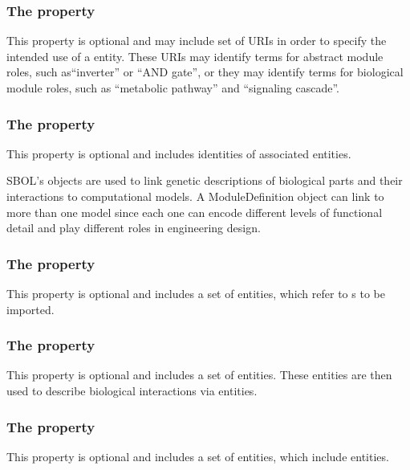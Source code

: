 \subsubsection*{The  property}
This property is optional and may include  set of URIs in order to specify the intended use of a  entity. These URIs may identify terms for abstract module roles, such as``inverter'' or ``AND gate'', or they may identify terms for biological module roles, such as ``metabolic pathway'' and ``signaling cascade''.

\subsubsection*{The  property}
This property is optional and includes identities of associated  entities.

SBOL's  objects are used to link genetic descriptions of biological parts and their interactions to computational models.
A ModuleDefinition object can link to more than one model since each one can encode different levels of functional detail and play different roles in engineering design. 


\subsubsection*{The  property}
This property is optional and includes a set of  entities, which refer to s to be imported.

\subsubsection*{The  property}
This property is optional and includes a set of  entities. These entities are then used to describe biological interactions via  entities.

\subsubsection*{The  property}
This property is optional and includes a set of  entities, which include  entities.

